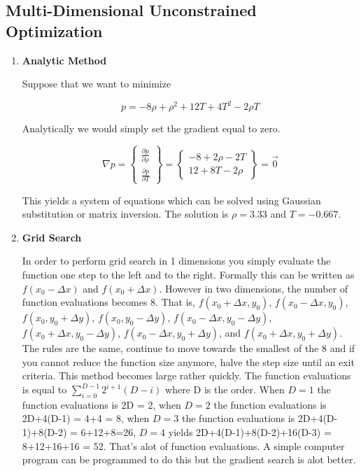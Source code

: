 \subsection {Multi-Dimensional Unconstrained Optimization}

\begin{enumerate}

\item {\bf Analytic Method}

Suppose that we want to minimize

\begin{equation}
p = -8\rho + \rho^2 + 12 T + 4T^2 - 2\rho T
\end{equation}

Analytically we would simply set the gradient equal to zero.

\begin{equation}
  \nabla p = \begin{Bmatrix} \frac{\partial
      p}{\partial \rho}
    \\ \frac{\partial p}{\partial T}\end{Bmatrix} = \begin{Bmatrix} -8
    + 2\rho -2T \\ 12 + 8T - 2\rho \end{Bmatrix} = \vec{0}
\end{equation}

This yields a system of equations which can be solved using Gaussian
substitution or matrix inversion. The solution is $\rho = 3.33$ and $T
= -0.667$. 

\item{\bf Grid Search}

In order to perform grid search in 1 dimensions you simply evaluate
the function one step to the left and to the right. Formally this can
be written as $f(x_0-\Delta x)$ and $f(x_0+\Delta x)$. However in two
dimensions, the number of function evaluations becomes 8. That is,
$f(x_0+\Delta x,y_0)$, $f(x_0-\Delta x,y_0)$, $f(x_0,y_0+\Delta y)$,
$f(x_0,y_0-\Delta y)$, $f(x_0-\Delta x,y_0-\Delta y)$, $f(x_0+\Delta
x,y_0-\Delta y)$, $f(x_0-\Delta x,y_0+\Delta y)$, and $f(x_0+\Delta
x,y_0+\Delta y)$. The rules are the same, continue to move towards the
smallest of the 8 and if you cannot reduce the function size anymore,
halve the step size until an exit criteria. This method becomes large
rather quickly. The function evaluations is equal to
$\sum\limits_{i=0}^{D-1} 2^{i+1}(D-i)$ where D
is the order. When $D=1$ the function evaluations is 2D = 2, when
$D=2$ the function evaluations is 2D+4(D-1) = 4+4 = 8, when $D=3$ the
function evaluations is 2D+4(D-1)+8(D-2) = 6+12+8=26, $D=4$ yields
2D+4(D-1)+8(D-2)+16(D-3) = 8+12+16+16 = 52. That's alot of function
evaluations. A simple computer program can be programmed to do this
but the gradient search is alot better.


\end{enumerate}
